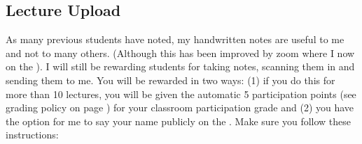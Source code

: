 \subsection*{Lecture Upload}\label{subsec:lecture_upload}

As many previous students have noted, my handwritten notes are useful to me and not to many others. (Although this has been improved by zoom where I now  on the ). I will still be rewarding students for taking notes, scanning them in and sending them to me. You will be rewarded in two ways: (1) if you do this for more than 10 lectures, you will be given the automatic 5 participation points (see grading policy on page \pageref{sec:grading}) for your classroom participation grade and (2) you have the option for me to say your name publicly on the \coursewebpagelink. Make sure you follow these instructions:

